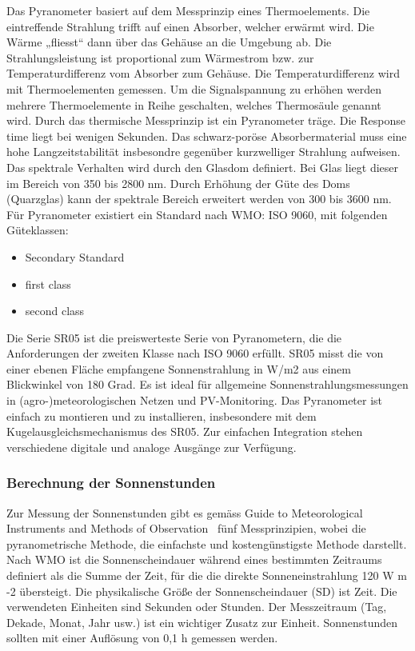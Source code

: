 Das Pyranometer basiert auf dem Messprinzip eines Thermoelements. Die eintreffende Strahlung trifft auf einen Absorber, welcher erwärmt wird. Die Wärme „fliesst“ dann über das Gehäuse an die Umgebung ab. Die Strahlungsleistung ist proportional zum Wärmestrom bzw. zur Temperaturdifferenz vom Absorber zum Gehäuse. Die Temperaturdifferenz wird mit Thermoelementen gemessen. Um die Signalspannung zu erhöhen werden mehrere Thermoelemente in Reihe geschalten, welches Thermosäule genannt wird. Durch das thermische Messprinzip ist ein Pyranometer träge. Die Response time liegt bei wenigen Sekunden. Das schwarz-poröse Absorbermaterial muss eine hohe Langzeitstabilität insbesondre gegenüber kurzwelliger Strahlung aufweisen. Das spektrale Verhalten wird durch den Glasdom definiert. Bei Glas liegt dieser im Bereich von 350 bis 2800 nm. Durch Erhöhung der Güte des Doms (Quarzglas) kann der spektrale Bereich erweitert werden von 300 bis 3600 nm. Für Pyranometer existiert ein Standard nach WMO: ISO 9060, mit folgenden Güteklassen:

\begin{itemize}
\item Secondary Standard
\item first class
\item second class
\end{itemize}


Die Serie SR05 ist die preiswerteste Serie von Pyranometern, die die Anforderungen der zweiten Klasse nach ISO 9060 erfüllt. SR05 misst die von einer ebenen Fläche empfangene Sonnenstrahlung in W/m2 aus einem Blickwinkel von 180 Grad. Es ist ideal für allgemeine Sonnenstrahlungsmessungen in (agro-)meteorologischen Netzen und PV-Monitoring. Das Pyranometer ist einfach zu montieren und zu installieren, insbesondere mit dem Kugelausgleichsmechanismus des SR05. Zur einfachen Integration stehen verschiedene digitale und analoge Ausgänge zur Verfügung.


\subsubsection{Berechnung der Sonnenstunden}
Zur Messung der Sonnenstunden gibt es gemäss  \flqq Guide to Meteorological Instruments and Methods of Observation\frqq ~\cite{WMO2014Gtmi}  fünf Messprinzipien, wobei die pyranometrische Methode, die einfachste und kostengünstigste Methode darstellt. Nach WMO ist die Sonnenscheindauer während eines bestimmten Zeitraums definiert als die Summe der Zeit, für die die direkte Sonneneinstrahlung 120 W m -2 übersteigt. Die physikalische Größe der Sonnenscheindauer (SD) ist Zeit. Die verwendeten Einheiten sind Sekunden oder Stunden. Der Messzeitraum (Tag, Dekade, Monat, Jahr usw.) ist ein wichtiger Zusatz zur Einheit. Sonnenstunden sollten mit einer Auflösung von 0,1 h gemessen werden.

